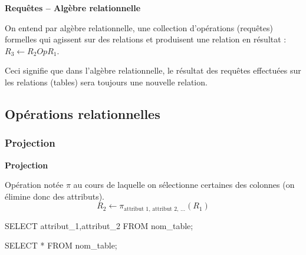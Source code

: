 \documentclass[10pt]{article}
\begin{document}
\begin{defi}
\textbf{Requêtes -- Algèbre relationnelle}

On entend par algèbre relationnelle, une collection d'opérations (requêtes) formelles qui agissent sur des relations et produisent une relation en résultat : $R_3 \leftarrow R_2 Op R_1$.
\end{defi}

Ceci signifie que dans l'algèbre relationnelle, le résultat des requêtes effectuées sur les relations (tables) sera toujours une nouvelle relation. 
%
%
%
%


\subsection{Opérations relationnelles}
\subsubsection{Projection}

\begin{defi}

\textbf{Projection}

Opération notée $\pi$ au cours de laquelle on sélectionne certaines des colonnes (on élimine donc des attributs). 
$$
 R_2 \leftarrow \pi_{\text{attribut 1, attribut 2, ...}}(R_1)
$$

\begin{envsql}
\begin{sql}
SELECT attribut_1,attribut_2 FROM nom_table;

SELECT * FROM nom_table;
\end{sql}
\end{envsql}
\end{defi}
\end{document}
